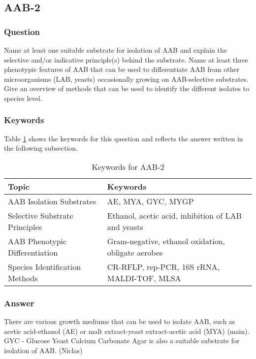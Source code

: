 \subsection{AAB-2}
\subsubsection*{Question}
Name at least one suitable substrate for isolation of AAB and explain the selective and/or indicative principle(s) behind the substrate. Name at least three phenotypic features of AAB that can be used to differentiate AAB from other microorganisms (LAB, yeasts) occasionally growing on AAB-selective substrates. Give an overview of methods that can be used to identify the different isolates to species level. 

\subsubsection*{Keywords}
Table \ref{tab:KW-AAB2} shows the keywords for this question and reflects the answer written in the following subsection.
\begin{table}[h]
    \centering
    \caption{Keywords for AAB-2} 
    \label{tab:KW-AAB2}
    \begin{tabular}{l|l}
        \textbf{Topic} & \textbf{Keywords} \\
        \hline
        AAB Isolation Substrates & AE, MYA, GYC, MYGP \\
        Selective Substrate Principles & Ethanol, acetic acid, inhibition of LAB and yeasts \\
        AAB Phenotypic Differentiation & Gram-negative, ethanol oxidation, obligate aerobes \\
        Species Identification Methods & CR-RFLP, rep-PCR, 16S rRNA, MALDI-TOF, MLSA \\
    \end{tabular}
\end{table}

\subsubsection*{Answer}
There are various growth mediums that can be used to isolate AAB, such as acetic acid-ethanol (AE) or malt extract-yeast extract-acetic acid (MYA) (main).
GYC - Glucose Yeast Calcium Carbonate Agar is also a suitable substrate for isolation of AAB. (Niclas)

